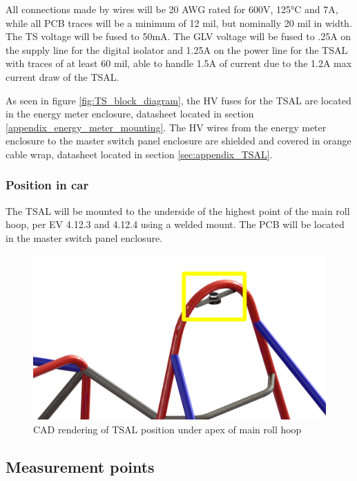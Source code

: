 \documentclass{article}
\begin{document}
All connections made by wires will be 20 AWG rated for 600V, 125°C and 7A, while all PCB traces will be a minimum of 12 mil, but nominally 20 mil in width. The TS voltage will be fused to 50mA. The GLV voltage will be fused to .25A on the supply line for the digital isolator and 1.25A on the power line for the TSAL with traces of at least 60 mil, able to handle 1.5A of current due to the 1.2A max current draw of the TSAL.

As seen in figure \ref{fig:TS_block_diagram}, the HV fuses for the TSAL are located in the energy meter enclosure, datasheet located in section \ref{appendix_energy_meter_mounting}. The HV wires from the energy meter enclosure to the master switch panel enclosure are shielded and covered in orange cable wrap, datasheet located in section \ref{sec:appendix_TSAL}. 

\subsubsection{Position in car}
The TSAL will be mounted to the underside of the highest point of the main roll hoop, per EV 4.12.3 and 4.12.4 using a welded mount. The PCB will be located in the master switch panel enclosure.

\begin{figure}[H]
\centering
\includegraphics[scale=1]{TSAL_mounting.png}
\caption{CAD rendering of TSAL position under apex of main roll hoop}
\end{figure}

\subsection{Measurement points}\label{measurement_points}
\end{document}
